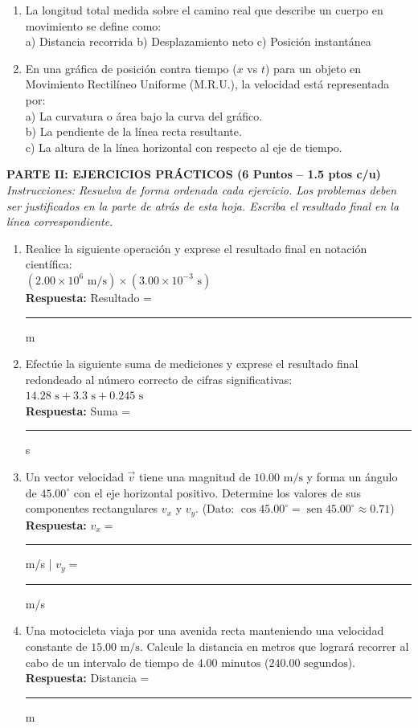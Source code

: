 \documentclass[10pt]{article}
\begin{document}
\begin{enumerate}[leftmargin=*]
    \item La longitud total medida sobre el camino real que describe un cuerpo en movimiento se define como: \\
    a) Distancia recorrida \hfill b) Desplazamiento neto \hfill c) Posición instantánea \hfill \mbox{}

    \item En una gráfica de posición contra tiempo ($x$ vs $t$) para un objeto en Movimiento Rectilíneo Uniforme (M.R.U.), la velocidad está representada por: \\
    a) La curvatura o área bajo la curva del gráfico. \\
    b) La pendiente de la línea recta resultante. \\
    c) La altura de la línea horizontal con respecto al eje de tiempo.
\end{enumerate}

\vspace{0.3cm}
\noindent \textbf{PARTE II: EJERCICIOS PRÁCTICOS (6 Puntos -- 1.5 ptos c/u)} \\
\textit{Instrucciones: Resuelva de forma ordenada cada ejercicio. Los problemas deben ser justificados en la parte de atrás de esta hoja. Escriba el resultado final en la línea correspondiente.}

\begin{enumerate}[leftmargin=*]
    \item Realice la siguiente operación y exprese el resultado final en notación científica: \\
    $(2.00 \times 10^6\text{ m/s}) \times (3.00 \times 10^{-3}\text{ s})$ \\
    \textbf{Respuesta:} Resultado = \rule{5cm}{0.1pt} m

    \item Efectúe la siguiente suma de mediciones y exprese el resultado final redondeado al número correcto de cifras significativas: \\
    $14.28\text{ s} + 3.3\text{ s} + 0.245\text{ s}$ \\
    \textbf{Respuesta:} Suma = \rule{5cm}{0.1pt} s

    \item Un vector velocidad $\vec{v}$ tiene una magnitud de $10.00\text{ m/s}$ y forma un ángulo de $45.00^\circ$ con el eje horizontal positivo. Determine los valores de sus componentes rectangulares $v_x$ y $v_y$. (Dato: $\cos 45.00^\circ = \operatorname{sen} 45.00^\circ \approx 0.71$) \\
    \textbf{Respuesta:} $v_x = $ \rule{3cm}{0.1pt} m/s \quad | \quad $v_y = $ \rule{3cm}{0.1pt} m/s

    \item Una motocicleta viaja por una avenida recta manteniendo una velocidad constante de $15.00\text{ m/s}$. Calcule la distancia en metros que logrará recorrer al cabo de un intervalo de tiempo de $4.00\text{ minutos}$ ($240.00\text{ segundos}$). \\
    \textbf{Respuesta:} Distancia = \rule{5cm}{0.1pt} m
\end{enumerate}
\end{document}
